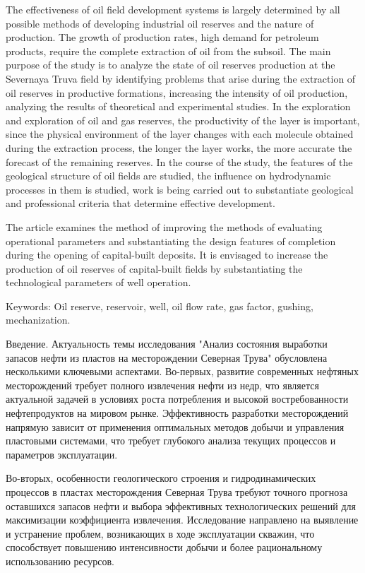 The effectiveness of oil field development systems is largely determined
by all possible methods of developing industrial oil reserves and the
nature of production. The growth of production rates, high demand for
petroleum products, require the complete extraction of oil from the
subsoil. The main purpose of the study is to analyze the state of oil
reserves production at the Severnaya Truva field by identifying problems
that arise during the extraction of oil reserves in productive
formations, increasing the intensity of oil production, analyzing the
results of theoretical and experimental studies. In the exploration and
exploration of oil and gas reserves, the productivity of the layer is
important, since the physical environment of the layer changes with each
molecule obtained during the extraction process, the longer the layer
works, the more accurate the forecast of the remaining reserves. In the
course of the study, the features of the geological structure of oil
fields are studied, the influence on hydrodynamic processes in them is
studied, work is being carried out to substantiate geological and
professional criteria that determine effective development.

The article examines the method of improving the methods of evaluating
operational parameters and substantiating the design features of
completion during the opening of capital-built deposits. It is envisaged
to increase the production of oil reserves of capital-built fields by
substantiating the technological parameters of well operation.

Keywords: Oil reserve, reservoir, well, oil flow rate, gas factor,
gushing, mechanization.

Введение. Актуальность темы исследования "Анализ состояния выработки
запасов нефти из пластов на месторождении Северная Трува" обусловлена
несколькими ключевыми аспектами. Во-первых, развитие современных
нефтяных месторождений требует полного извлечения нефти из недр, что
является актуальной задачей в условиях роста потребления и высокой
востребованности нефтепродуктов на мировом рынке. Эффективность
разработки месторождений напрямую зависит от применения оптимальных
методов добычи и управления пластовыми системами, что требует глубокого
анализа текущих процессов и параметров эксплуатации.

Во-вторых, особенности геологического строения и гидродинамических
процессов в пластах месторождения Северная Трува требуют точного
прогноза оставшихся запасов нефти и выбора эффективных технологических
решений для максимизации коэффициента извлечения. Исследование
направлено на выявление и устранение проблем, возникающих в ходе
эксплуатации скважин, что способствует повышению интенсивности добычи и
более рациональному использованию ресурсов.

